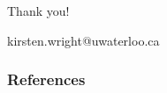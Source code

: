 \documentclass{beamer}
\begin{document}
\begin{frame}
    \frametitle{}
    \centering
    
    \Large\color{titlecolor}
    Thank you!

    \vspace{0.5cm}
    kirsten.wright@uwaterloo.ca

\end{frame}

\begin{frame}
\frametitle{References}
\small
\end{frame}

\end{document}
